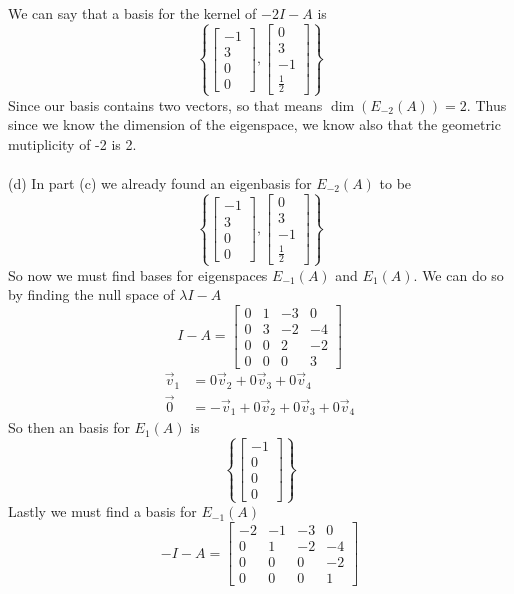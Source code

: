 \documentclass{report}
\begin{document}
We can say that a basis for the kernel of $-2I-A$ is
$$
\left\{
\begin{bmatrix}-1\\3\\0\\0\end{bmatrix},\begin{bmatrix}0\\3\\-1\\\frac{1}{2}\end{bmatrix}
\right\}
$$
Since our basis contains two vectors,  so that means $\dim(E_{-2}(A)) = 2$.  Thus since we know the dimension of the eigenspace,  we know also that the geometric mutiplicity of -2 is 2. \\
\\
\noindent (d) In part (c) we already found an eigenbasis for $E_{-2}(A)$ to be
$$
\left\{
\begin{bmatrix}-1\\3\\0\\0\end{bmatrix},\begin{bmatrix}0\\3\\-1\\\frac{1}{2}\end{bmatrix}
\right\}
$$
So now we must find bases for eigenspaces $E_{-1}(A)$ and $E_{1}(A)$.  We can do so by finding the null space of $\lambda I - A$
$$
I - A = \begin{bmatrix}
0&1&-3&0\\
0&3&-2&-4\\
0&0&2&-2\\
0&0&0&3
\end{bmatrix}
$$
$$
\begin{aligned}
\vec{v}_1 &= 0\vec{v}_2 + 0\vec{v}_3 + 0\vec{v}_4 \\
\vec{0} &= -\vec{v}_1 + 0\vec{v}_2 + 0\vec{v}_3 + 0\vec{v}_4
\end{aligned}
$$
So then an basis for $E_1(A)$ is
$$
\left\{
\begin{bmatrix}-1\\0\\0\\0\end{bmatrix}
\right\}
$$
Lastly we must find a basis for $E_{-1}(A)$
$$
-I - A = \begin{bmatrix}
-2&-1&-3&0\\
0&1&-2&-4\\
0&0&0&-2\\
0&0&0&1
\end{bmatrix}
$$
\end{document}
